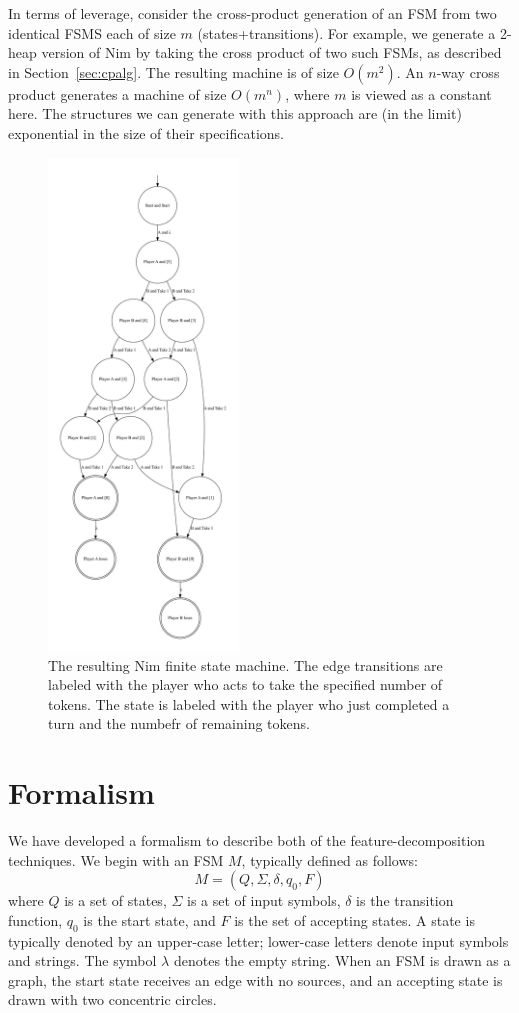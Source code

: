 \documentclass[sigplan,anonymous, review]{acmart}
\begin{document}
In terms of leverage, consider the cross-product generation of an FSM from two identical FSMS each of size $m$ (states+transitions).  For example, we generate a 2-heap version of Nim by taking the cross product of two such FSMs, as described in Section~\ref{sec:cpalg}.  The resulting machine is of size $O(m^{2})$.  An $n$-way cross product generates a machine of size $O(m^{n})$, where $m$ is viewed as a constant here.  The structures we can generate with this approach are (in the limit) exponential in the size of their specifications.

\begin{figure}
    \centering
    \includegraphics[width=0.45\textwidth]{figures/nimexample/nimFSM.pdf}
    \caption{The resulting Nim finite state machine.  The edge transitions are labeled with the player who acts to take the specified number of tokens. The state is labeled with the player who just completed a turn and the numbefr of remaining tokens.}
    \label{fig:nimFSM}
\end{figure}

\section{Formalism}\label{sec:formal}
We have developed a formalism to describe both of the feature-decomposition techniques. We begin with an FSM $M$, typically defined as follows: 
\[M = (Q, \Sigma, \delta, q_0, F)\]where $Q$ is a set of states, $\Sigma$ is a set of input symbols, $\delta$ is the transition function, $q_0$ is the start state, and $F$ is the set of accepting states.  A state is typically denoted by an upper-case letter;  lower-case letters denote input symbols and strings.  The symbol $\lambda$ denotes the empty string.  When an FSM is drawn as a graph, the start state receives an edge with no sources, and an accepting state is drawn with two concentric circles. 
\end{document}
